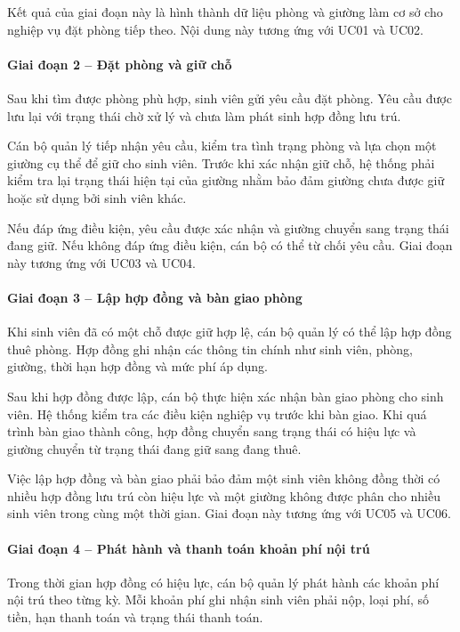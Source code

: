 Kết quả của giai đoạn này là hình thành dữ liệu phòng và giường làm cơ sở cho nghiệp vụ đặt phòng tiếp theo. Nội dung này tương ứng với UC01 và UC02.

\paragraph{Giai đoạn 2 – Đặt phòng và giữ chỗ}

Sau khi tìm được phòng phù hợp, sinh viên gửi yêu cầu đặt phòng. Yêu cầu được lưu lại với trạng thái chờ xử lý và chưa làm phát sinh hợp đồng lưu trú.

Cán bộ quản lý tiếp nhận yêu cầu, kiểm tra tình trạng phòng và lựa chọn một giường cụ thể để giữ cho sinh viên. Trước khi xác nhận giữ chỗ, hệ thống phải kiểm tra lại trạng thái hiện tại của giường nhằm bảo đảm giường chưa được giữ hoặc sử dụng bởi sinh viên khác.

Nếu đáp ứng điều kiện, yêu cầu được xác nhận và giường chuyển sang trạng thái đang giữ. Nếu không đáp ứng điều kiện, cán bộ có thể từ chối yêu cầu. Giai đoạn này tương ứng với UC03 và UC04.

\paragraph{Giai đoạn 3 – Lập hợp đồng và bàn giao phòng}

Khi sinh viên đã có một chỗ được giữ hợp lệ, cán bộ quản lý có thể lập hợp đồng thuê phòng. Hợp đồng ghi nhận các thông tin chính như sinh viên, phòng, giường, thời hạn hợp đồng và mức phí áp dụng.

Sau khi hợp đồng được lập, cán bộ thực hiện xác nhận bàn giao phòng cho sinh viên. Hệ thống kiểm tra các điều kiện nghiệp vụ trước khi bàn giao. Khi quá trình bàn giao thành công, hợp đồng chuyển sang trạng thái có hiệu lực và giường chuyển từ trạng thái đang giữ sang đang thuê.

Việc lập hợp đồng và bàn giao phải bảo đảm một sinh viên không đồng thời có nhiều hợp đồng lưu trú còn hiệu lực và một giường không được phân cho nhiều sinh viên trong cùng một thời gian. Giai đoạn này tương ứng với UC05 và UC06.

\paragraph{Giai đoạn 4 – Phát hành và thanh toán khoản phí nội trú}

Trong thời gian hợp đồng có hiệu lực, cán bộ quản lý phát hành các khoản phí nội trú theo từng kỳ. Mỗi khoản phí ghi nhận sinh viên phải nộp, loại phí, số tiền, hạn thanh toán và trạng thái thanh toán.

